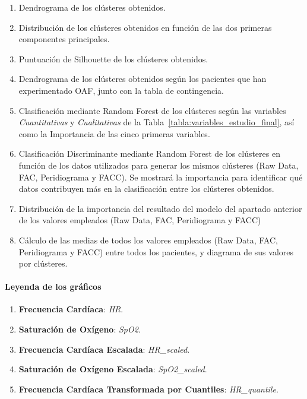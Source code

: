 \begin{enumerate}
    \item Dendrograma de los clústeres obtenidos.
    \item Distribución de los clústeres obtenidos en función de las dos primeras componentes principales.
    \item Puntuación de Silhouette de los clústeres obtenidos.
    \item Dendrograma de los clústeres obtenidos según los pacientes que han experimentado OAF, junto con la tabla de contingencia.
    \item Clasificación mediante Random Forest de los clústeres según las variables \textit{Cuantitativas} y \textit{Cualitativas} de la Tabla~\ref{tabla:variables_estudio_final}, así como la Importancia de las cinco primeras variables.
    \item Clasificación Discriminante mediante Random Forest de los clústeres en función de los datos utilizados para generar los mismos clústeres (Raw Data, FAC, Peridiograma y FACC). Se mostrará la importancia para identificar qué datos contribuyen más en la clasificación entre los clústeres obtenidos.
    \item Distribución de la importancia del resultado del modelo del apartado anterior de los valores empleados (Raw Data, FAC, Peridiograma y FACC) 
    \item Cálculo de las medias de todos los valores empleados (Raw Data, FAC, Peridiograma y FACC) entre todos los pacientes, y diagrama de sus valores por clústeres.
\end{enumerate}

\paragraph{Leyenda de los gráficos}

\begin{enumerate}
    \item \textbf{Frecuencia Cardíaca}: \textit{HR}.
    \item \textbf{Saturación de Oxígeno}: \textit{SpO2}.
    \item \textbf{Frecuencia Cardíaca Escalada}: \textit{HR\_scaled}.
    \item \textbf{Saturación de Oxígeno Escalada}: \textit{SpO2\_scaled}.
    \item \textbf{Frecuencia Cardíaca Transformada por Cuantiles}: \textit{HR\_quantile}.
\end{enumerate}

\newpage


\newpage


\newpage


\newpage


